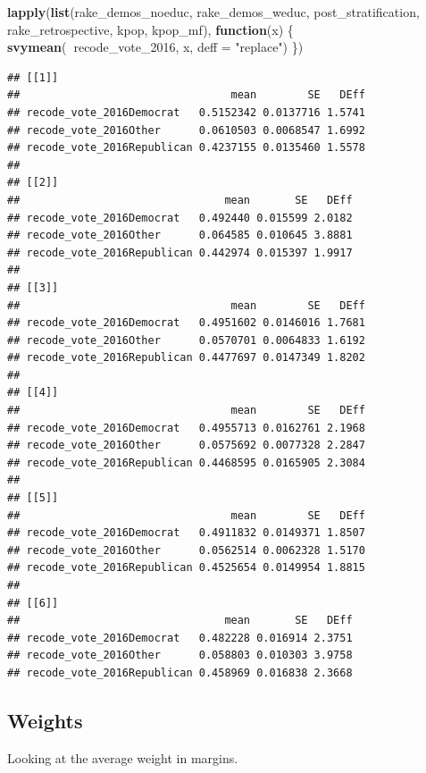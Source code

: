 \documentclass[]{article}
\newenvironment{Shaded}{\begin{snugshade}}{\end{snugshade}}
\newcommand{\ControlFlowTok}[1]{\textcolor[rgb]{0.13,0.29,0.53}{\textbf{#1}}}
\newcommand{\DataTypeTok}[1]{\textcolor[rgb]{0.13,0.29,0.53}{#1}}
\newcommand{\DecValTok}[1]{\textcolor[rgb]{0.00,0.00,0.81}{#1}}
\newcommand{\KeywordTok}[1]{\textcolor[rgb]{0.13,0.29,0.53}{\textbf{#1}}}
\newcommand{\NormalTok}[1]{#1}
\newcommand{\OperatorTok}[1]{\textcolor[rgb]{0.81,0.36,0.00}{\textbf{#1}}}
\newcommand{\StringTok}[1]{\textcolor[rgb]{0.31,0.60,0.02}{#1}}
\begin{document}
\begin{Shaded}
\begin{Highlighting}[]
\KeywordTok{lapply}\NormalTok{(}\KeywordTok{list}\NormalTok{(rake_demos_noeduc, rake_demos_weduc, post_stratification, rake_retrospective, kpop, kpop_mf), }
       \ControlFlowTok{function}\NormalTok{(x) \{}
         \KeywordTok{svymean}\NormalTok{(}\OperatorTok{~}\NormalTok{recode_vote_}\DecValTok{2016}\NormalTok{, x, }\DataTypeTok{deff =} \StringTok{"replace"}\NormalTok{)}
\NormalTok{       \})}
\end{Highlighting}
\end{Shaded}

\begin{verbatim}
## [[1]]
##                                 mean        SE   DEff
## recode_vote_2016Democrat   0.5152342 0.0137716 1.5741
## recode_vote_2016Other      0.0610503 0.0068547 1.6992
## recode_vote_2016Republican 0.4237155 0.0135460 1.5578
## 
## [[2]]
##                                mean       SE   DEff
## recode_vote_2016Democrat   0.492440 0.015599 2.0182
## recode_vote_2016Other      0.064585 0.010645 3.8881
## recode_vote_2016Republican 0.442974 0.015397 1.9917
## 
## [[3]]
##                                 mean        SE   DEff
## recode_vote_2016Democrat   0.4951602 0.0146016 1.7681
## recode_vote_2016Other      0.0570701 0.0064833 1.6192
## recode_vote_2016Republican 0.4477697 0.0147349 1.8202
## 
## [[4]]
##                                 mean        SE   DEff
## recode_vote_2016Democrat   0.4955713 0.0162761 2.1968
## recode_vote_2016Other      0.0575692 0.0077328 2.2847
## recode_vote_2016Republican 0.4468595 0.0165905 2.3084
## 
## [[5]]
##                                 mean        SE   DEff
## recode_vote_2016Democrat   0.4911832 0.0149371 1.8507
## recode_vote_2016Other      0.0562514 0.0062328 1.5170
## recode_vote_2016Republican 0.4525654 0.0149954 1.8815
## 
## [[6]]
##                                mean       SE   DEff
## recode_vote_2016Democrat   0.482228 0.016914 2.3751
## recode_vote_2016Other      0.058803 0.010303 3.9758
## recode_vote_2016Republican 0.458969 0.016838 2.3668
\end{verbatim}

\hypertarget{weights}{%
\subsection{Weights}\label{weights}}

Looking at the average weight in margins.
\end{document}
